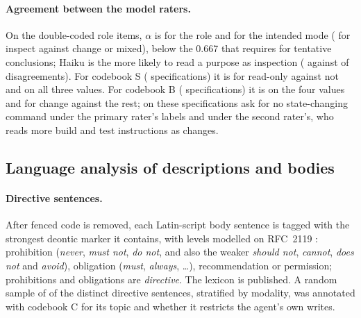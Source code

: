 \paragraph{Agreement between the model raters.} On the \nReliabilityItems{} double-coded role items, $\alpha$ is
\alphaRoleModels{} for the role and \alphaModeModels{} for the intended mode (\alphaModeBinaryModels{} for inspect
against change or mixed), below the 0.667 that \citet{krippendorff2018content} requires for tentative conclusions;
Haiku is the more likely to read a purpose as inspection (\nModeDisagreeHaikuInspect{} against
\nModeDisagreeSonnetInspect{} of \nModeDisagree{} disagreements). For codebook S (\nSpecReliability{} specifications)
it is \alphaSpecFull{} for read-only against not and \alphaSpecRestr{} on all three values. For codebook B
(\nShellReliability{} specifications) it is \alphaShellUse{} on the four values and \alphaShellChange{} for change
against the rest; on these specifications \ShellNoChangeHaikuRel{} ask for no state-changing command under the primary
rater's labels and \ShellNoChangeSonnetRel{} under the second rater's, who reads more build and test instructions as
changes.

\subsection{Language analysis of descriptions and bodies}
\label{sec:nlp}

\paragraph{Directive sentences.} After fenced code is removed, each Latin-script body sentence is tagged with the
strongest deontic marker it contains, with levels modelled on RFC~2119 \citep{rfc2119}: prohibition (\emph{never},
\emph{must not}, \emph{do not}, and also the weaker \emph{should not}, \emph{cannot}, \emph{does not} and
\emph{avoid}), obligation (\emph{must}, \emph{always}, \ldots),
recommendation or permission; prohibitions and obligations are \emph{directive}. The lexicon is published. A random
sample of \nConstraintSample{} of the \nDistinctDirective{} distinct directive sentences, stratified by modality, was
annotated with codebook C for its topic and whether it restricts the agent's own writes.

